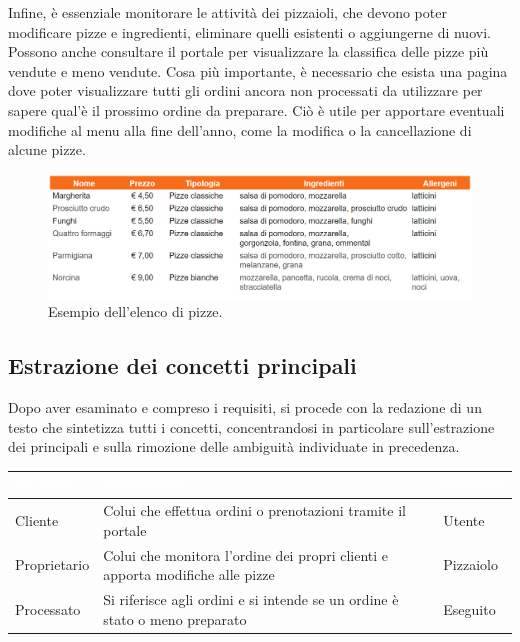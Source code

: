 \documentclass[a4paper,12pt, oneside]{article}
\begin{document}
Infine, è essenziale monitorare le attività dei pizzaioli, che devono
poter modificare pizze e ingredienti, eliminare quelli esistenti o
aggiungerne di nuovi. Possono anche consultare il portale per
visualizzare la classifica delle pizze più vendute e meno vendute.
Cosa più importante, è necessario che esista una pagina dove poter
visualizzare tutti gli ordini ancora non processati da utilizzare 
per sapere qual'è il prossimo ordine da preparare.
Ciò è utile per apportare eventuali modifiche al menu alla fine
dell'anno, come la modifica o la cancellazione di alcune pizze.

\begin{figure}[ht]
    \centering
    \includegraphics[width=1\textwidth]{esempio_pizze.png}
    \caption{Esempio dell'elenco di pizze.}
    \label{fig:esempio_pizze}
\end{figure}

\subsection{Estrazione dei concetti principali}

Dopo aver esaminato e compreso i requisiti, si procede con la redazione
di un testo che sintetizza tutti i concetti, concentrandosi in
particolare sull'estrazione dei principali e sulla rimozione delle
ambiguità individuate in precedenza.

\begin{table}[ht]
\begin{tabularx}{\textwidth}{>{\hsize=0.5\hsize\RaggedRight\arraybackslash}X>{\hsize=2\hsize\RaggedRight\arraybackslash}X>{\hsize=0.5\hsize\RaggedRight\arraybackslash}X}
    \rowcolor[HTML]{f66c19} 
    \textcolor{white}{Termine} & \textcolor{white}{Descrizione} & \textcolor{white}{Sinonimi} \\ \hline
    \rowcolor[HTML]{FFFFFF} 
    Cliente & Colui che effettua ordini o prenotazioni tramite il portale & Utente \\ \hline
    \rowcolor[HTML]{FFFFFF} 
    Proprietario & Colui che monitora l'ordine dei propri clienti e apporta modifiche alle pizze & Pizzaiolo \\ \hline
    \rowcolor[HTML]{FFFFFF} 
    Processato & Si riferisce agli ordini e si intende se un ordine è stato o meno preparato & Eseguito
\end{tabularx}
\end{table}
\end{document}
